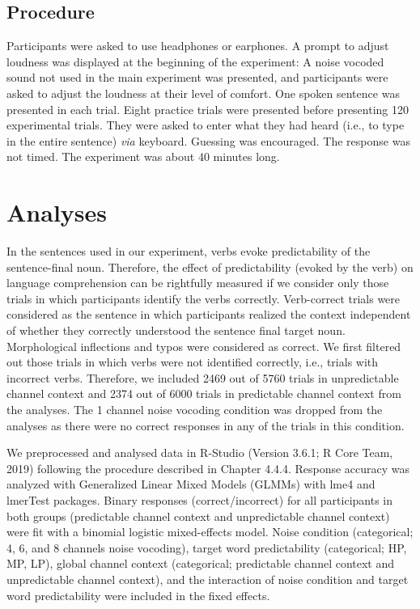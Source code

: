 \documentclass[a4paper, nobind]{templates/ociamthesis}
\begin{document}
\hypertarget{procedure}{%
\subsection{Procedure}\label{procedure}}

Participants were asked to use headphones or earphones.
A prompt to adjust loudness was displayed at the beginning of the experiment: A noise vocoded sound not used in the main experiment was presented, and participants were asked to adjust the loudness at their level of comfort.
One spoken sentence was presented in each trial.
Eight practice trials were presented before presenting 120 experimental trials.
They were asked to enter what they had heard (i.e., to type in the entire sentence) \emph{via} keyboard.
Guessing was encouraged.
The response was not timed.
The experiment was about 40 minutes long.

\hypertarget{analyses-2}{%
\section{Analyses}\label{analyses-2}}

In the sentences used in our experiment, verbs evoke predictability of the sentence-final noun.
Therefore, the effect of predictability (evoked by the verb) on language comprehension can be rightfully measured if we consider only those trials in which participants identify the verbs correctly.
Verb-correct trials were considered as the sentence in which participants realized the context independent of whether they correctly understood the sentence final target noun.
Morphological inflections and typos were considered as correct.
We first filtered out those trials in which verbs were not identified correctly, i.e., trials with incorrect verbs.
Therefore, we included 2469 out of 5760 trials in unpredictable channel context and 2374 out of 6000 trials in predictable channel context from the analyses.
The 1 channel noise vocoding condition was dropped from the analyses as there were no correct responses in any of the trials in this condition.

We preprocessed and analysed data in R-Studio (Version 3.6.1; R Core Team, 2019) following the procedure described in Chapter 4.4.4.
Response accuracy was analyzed with Generalized Linear Mixed Models (GLMMs) with lme4 \autocite{Bates2015} and lmerTest \autocite{Kuznetsova2017} packages.
Binary responses (correct/incorrect) for all participants in both groups (predictable channel context and unpredictable channel context) were fit with a binomial logistic mixed-effects model.
Noise condition (categorical; 4, 6, and 8 channels noise vocoding), target word predictability (categorical; HP, MP, LP), global channel context (categorical; predictable channel context and unpredictable channel context), and the interaction of noise condition and target word predictability were included in the fixed effects.
\end{document}
